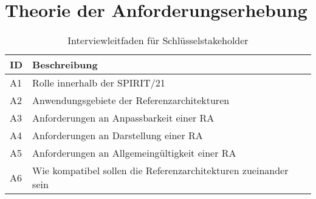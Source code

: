 \section{Theorie der Anforderungserhebung}

\begin{table}[H]
\centering
\begin{tabular}{|l|l|}
\hline
ID & Beschreibung \\ \hline
A1 & Rolle innerhalb der SPIRIT/21 \\ \hline
A2 & Anwendungsgebiete der Referenzarchitekturen \\ \hline
A3 & Anforderungen an Anpassbarkeit einer RA \\ \hline
A4 & Anforderungen an Darstellung einer RA \\ \hline
A5 & Anforderungen an Allgemeingültigkeit einer RA \\ \hline
A6 & Wie kompatibel sollen die Referenzarchitekturen zueinander sein \\ \hline
\end{tabular}
\caption{Interviewleitfaden für Schlüsselstakeholder}
\label{tab:intervieleitfaden}
\end{table}